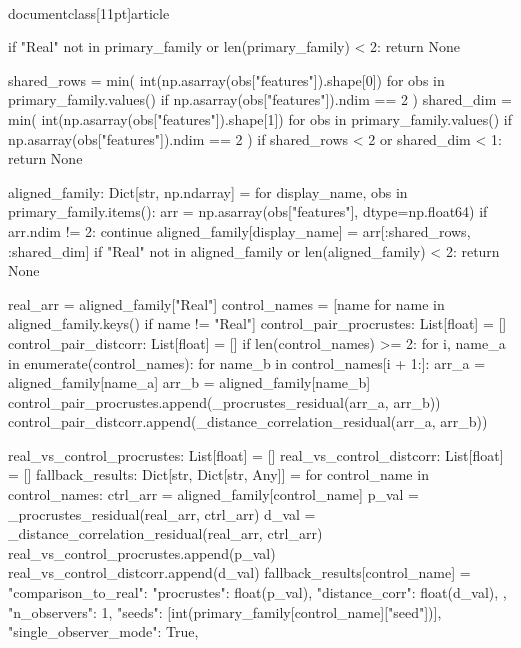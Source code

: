 \\documentclass[11pt]{article}
\begin{document}
\begin{CodeBlock}
        if "Real" not in primary_family or len(primary_family) < 2:
            return None

        shared_rows = min(
            int(np.asarray(obs["features"]).shape[0])
            for obs in primary_family.values()
            if np.asarray(obs["features"]).ndim == 2
        )
        shared_dim = min(
            int(np.asarray(obs["features"]).shape[1])
            for obs in primary_family.values()
            if np.asarray(obs["features"]).ndim == 2
        )
        if shared_rows < 2 or shared_dim < 1:
            return None

        aligned_family: Dict[str, np.ndarray] = {}
        for display_name, obs in primary_family.items():
            arr = np.asarray(obs["features"], dtype=np.float64)
            if arr.ndim != 2:
                continue
            aligned_family[display_name] = arr[:shared_rows, :shared_dim]
        if "Real" not in aligned_family or len(aligned_family) < 2:
            return None

        real_arr = aligned_family["Real"]
        control_names = [name for name in aligned_family.keys() if name != "Real"]
        control_pair_procrustes: List[float] = []
        control_pair_distcorr: List[float] = []
        if len(control_names) >= 2:
            for i, name_a in enumerate(control_names):
                for name_b in control_names[i + 1:]:
                    arr_a = aligned_family[name_a]
                    arr_b = aligned_family[name_b]
                    control_pair_procrustes.append(_procrustes_residual(arr_a, arr_b))
                    control_pair_distcorr.append(_distance_correlation_residual(arr_a, arr_b))

        real_vs_control_procrustes: List[float] = []
        real_vs_control_distcorr: List[float] = []
        fallback_results: Dict[str, Dict[str, Any]] = {}
        for control_name in control_names:
            ctrl_arr = aligned_family[control_name]
            p_val = _procrustes_residual(real_arr, ctrl_arr)
            d_val = _distance_correlation_residual(real_arr, ctrl_arr)
            real_vs_control_procrustes.append(p_val)
            real_vs_control_distcorr.append(d_val)
            fallback_results[control_name] = {
                "comparison_to_real": {
                    "procrustes": float(p_val),
                    "distance_corr": float(d_val),
                },
                "n_observers": 1,
                "seeds": [int(primary_family[control_name]["seed"])],
                "single_observer_mode": True,
            }


\end{CodeBlock}
\end{document}
